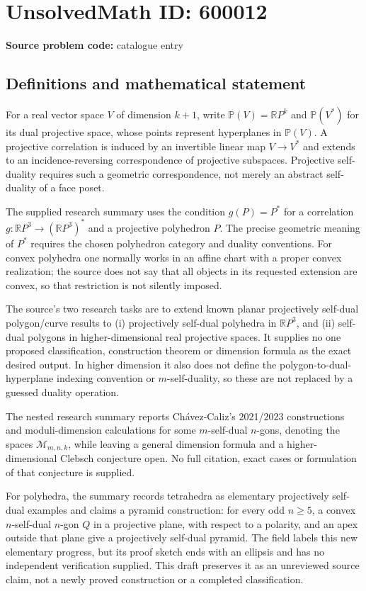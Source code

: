 \documentclass[11pt]{article}
\newcommand{\R}{\mathbb{R}}
\newcommand{\PP}{\mathbb{P}}
\begin{document}
\section*{UnsolvedMath ID: 600012}
\textbf{Source problem code:} catalogue entry
\subsection{Definitions and mathematical statement}
For a real vector space \(V\) of dimension \(k+1\), write \(\PP(V)=\R P^k\) and \(\PP(V^*)\) for its dual projective space, whose points represent hyperplanes in \(\PP(V)\). A projective correlation is induced by an invertible linear map \(V\to V^*\) and extends to an incidence-reversing correspondence of projective subspaces. Projective self-duality requires such a geometric correspondence, not merely an abstract self-duality of a face poset.

The supplied research summary uses the condition \(g(P)=P^*\) for a correlation \(g:\R P^3\to(\R P^3)^*\) and a projective polyhedron \(P\). The precise geometric meaning of \(P^*\) requires the chosen polyhedron category and duality conventions. For convex polyhedra one normally works in an affine chart with a proper convex realization; the source does not say that all objects in its requested extension are convex, so that restriction is not silently imposed.

The source's two research tasks are to extend known planar projectively self-dual polygon/curve results to (i) projectively self-dual polyhedra in \(\R P^3\), and (ii) self-dual polygons in higher-dimensional real projective spaces. It supplies no one proposed classification, construction theorem or dimension formula as the exact desired output. In higher dimension it also does not define the polygon-to-dual-hyperplane indexing convention or \(m\)-self-duality, so these are not replaced by a guessed duality operation.

The nested research summary reports Ch\'avez-Caliz's 2021/2023 constructions and moduli-dimension calculations for some \(m\)-self-dual \(n\)-gons, denoting the spaces \(\mathcal M_{m,n,k}\), while leaving a general dimension formula and a higher-dimensional Clebsch conjecture open. No full citation, exact cases or formulation of that conjecture is supplied.

For polyhedra, the summary records tetrahedra as elementary projectively self-dual examples and claims a pyramid construction: for every odd \(n\geq5\), a convex \(n\)-self-dual \(n\)-gon \(Q\) in a projective plane, with respect to a polarity, and an apex outside that plane give a projectively self-dual pyramid. The field labels this new elementary progress, but its proof sketch ends with an ellipsis and has no independent verification supplied. This draft preserves it as an unreviewed source claim, not a newly proved construction or a completed classification.
\end{document}

